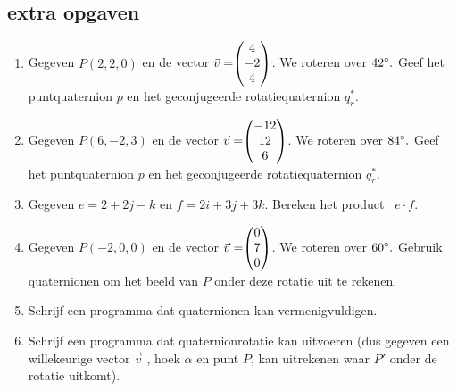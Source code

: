 \subsection{extra opgaven}
\begin{enumerate}
	\item Gegeven $ P (2,2,0) $ en de vector $\vec{v} = \vecdrie{4}{-2}{4} $. 
	We roteren over $ 42\degree. $ Geef het puntquaternion $p$ en het geconjugeerde rotatiequaternion  $  q_r^* $. \\
	
	\item Gegeven $ P (6,-2,3) $ en de vector $\vec{v} = \vecdrie{-12}{12}{6} $. 
	We roteren over $ 84\degree. $ Geef het puntquaternion $p$ en het geconjugeerde rotatiequaternion  $  q_r^* $. \\
	
	\item Gegeven $ e = 2 +2j-k $ en   $ f = 2i+3j+3k $. 
	Bereken het product \ $  e\cdot f $.\\
	
	\item  Gegeven $ P (-2, 0, 0) $ en de vector $\vec{v} = \vecdrie{0}{7}{0} $. 
	We roteren over $ 60\degree. $ Gebruik quaternionen om het beeld van $P$ onder deze rotatie uit te rekenen.   \\
	
	\item Schrijf een programma dat quaternionen kan vermenigvuldigen.  \\ 
	
	\item Schrijf een programma dat quaternionrotatie kan uitvoeren (dus gegeven een willekeurige vector $\vec{v} $ , hoek $ \alpha $ en punt $P$, kan uitrekenen waar $P'$ onder de rotatie uitkomt).      \\	
\end{enumerate}
